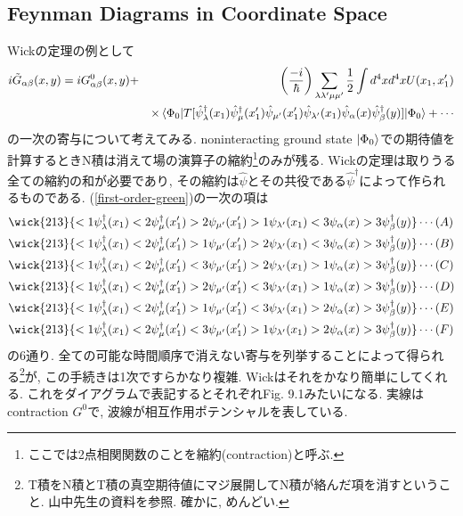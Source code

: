 \documentclass[10.5pt,a4paper]{jreport}
\newcommand{\hpsi}{\hat{\psi}}
\begin{document}
\subsection{Feynman Diagrams in Coordinate Space}
Wickの定理の例として
\begin{eqnarray}
\nonumber  i\tilde{G}_{\alpha\beta}(x, y) = iG^0_{\alpha\beta}(x, y) &+& \qty(\frac{-i}{\hbar})\sum_{\lambda\lambda'\mu\mu'}\frac{1}{2}\int d^4xd^4x U(x_1, x_1')\\
  &&\times \ev{T[\hpsi_{\lambda}^\dagger(x_1)\hpsi^\dagger_{\mu}(x_1')\hpsi_{\mu'}(x_1')\hpsi_{\lambda'}(x_1)\hpsi_{\alpha}(x)\hpsi^\dagger_{\beta}(y)]}{\Phi_0} + \cdots\label{first-order-green}
\end{eqnarray}
の一次の寄与について考えてみる. noninteracting ground state $\ket{\Phi_0}$での期待値を計算するときN積は消えて場の演算子の縮約\footnote{ここでは2点相関関数のことを縮約(contraction)と呼ぶ. }のみが残る. Wickの定理は取りうる全ての縮約の和が必要であり, その縮約は$\hpsi$とその共役である$\hpsi^\dagger$によって作られるものである. (\ref{first-order-green})の一次の項は
\begin{eqnarray}
  \wick{213}{<1\psi_{\lambda}^\dagger(x_1) <2\psi^\dagger_{\mu}(x_1') >2\psi_{\mu'}(x_1') >1\psi_{\lambda'}(x_1) <3\psi_{\alpha}(x) >3\psi^\dagger_{\beta}(y)} & \cdots(A)\\
  \wick{213}{<1\psi_{\lambda}^\dagger(x_1) <2\psi^\dagger_{\mu}(x_1') >1\psi_{\mu'}(x_1') >2\psi_{\lambda'}(x_1) <3\psi_{\alpha}(x) >3\psi^\dagger_{\beta}(y)} & \cdots(B)\\
  \wick{213}{<1\psi_{\lambda}^\dagger(x_1) <2\psi^\dagger_{\mu}(x_1') <3\psi_{\mu'}(x_1') >2\psi_{\lambda'}(x_1) >1\psi_{\alpha}(x) >3\psi^\dagger_{\beta}(y)} & \cdots(C)\\
  \wick{213}{<1\psi_{\lambda}^\dagger(x_1) <2\psi^\dagger_{\mu}(x_1') >2\psi_{\mu'}(x_1') <3\psi_{\lambda'}(x_1) >1\psi_{\alpha}(x) >3\psi^\dagger_{\beta}(y)} & \cdots(D)\\
  \wick{213}{<1\psi_{\lambda}^\dagger(x_1) <2\psi^\dagger_{\mu}(x_1') >1\psi_{\mu'}(x_1') <3\psi_{\lambda'}(x_1) >2\psi_{\alpha}(x) >3\psi^\dagger_{\beta}(y)} & \cdots(E)\\
  \wick{213}{<1\psi_{\lambda}^\dagger(x_1) <2\psi^\dagger_{\mu}(x_1') <3\psi_{\mu'}(x_1') >1\psi_{\lambda'}(x_1) >2\psi_{\alpha}(x) >3\psi^\dagger_{\beta}(y)} & \cdots(F)
\end{eqnarray}
の6通り. 全ての可能な時間順序で消えない寄与を列挙することによって得られる\footnote{T積をN積とT積の真空期待値にマジ展開してN積が絡んだ項を消すということ. 山中先生の資料を参照. 確かに, めんどい. }が, この手続きは1次ですらかなり複雑. Wickはそれをかなり簡単にしてくれる. これをダイアグラムで表記するとそれぞれFig. 9.1みたいになる. 実線はcontraction $G^0$で, 波線が相互作用ポテンシャルを表している.
\end{document}
